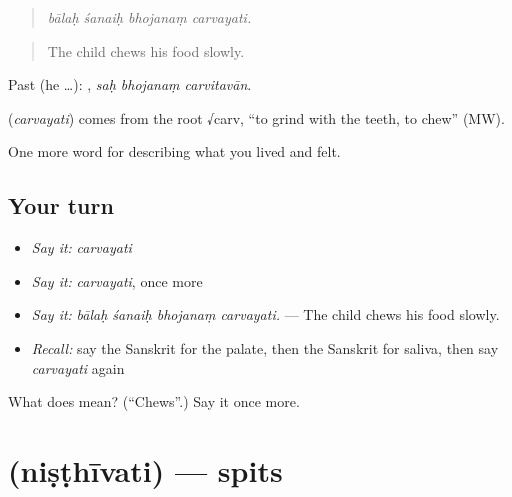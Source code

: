 \begin{quote}
   
\end{quote}

\begin{quote}
\emph{bālaḥ śanaiḥ bhojanaṃ carvayati.}
\end{quote}

\begin{quote}
The child chews his food slowly.
\end{quote}

Past (he …):   , \emph{saḥ bhojanaṃ carvitavān}.

\begin{cousinweb}
\textbf{} (\emph{carvayati}) comes from the root √carv, \textquotedblleft{}to grind with the teeth, to chew\textquotedblright{} (MW).
\end{cousinweb}

\begin{grammarlens}[title={What you've built}]
One more word for describing what you lived and felt.
\end{grammarlens}

\subsection*{Your turn}
\begin{itemize}
\raggedright
  \item \emph{Say it:} \emph{carvayati}
  \item \emph{Say it:} \emph{carvayati}, once more
  \item \emph{Say it:} \emph{bālaḥ śanaiḥ bhojanaṃ carvayati.} — The child chews his food slowly.
  \item \emph{Recall:} say the Sanskrit for the palate, then the Sanskrit for saliva, then say \emph{carvayati} again
\end{itemize}

\begin{tcolorbox}[breakable,colback=teal!4,colframe=teal!35!black,title={Before you move on}]
What does  mean? (\textquotedblleft{}Chews\textquotedblright{}.) Say it once more.
\end{tcolorbox}
\section[\texorpdfstring{\sk{निष्ठीवति} (niṣṭhīvati)}{निष्ठीवति (niṣṭhīvati)}]{ (niṣṭhīvati) — spits}

